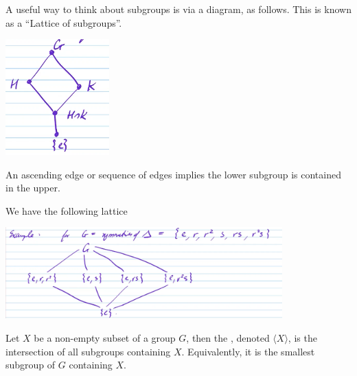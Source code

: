 \documentclass[a4]{scrartcl}
\begin{document}
A useful way to think about subgroups is via a diagram, as follows.
This is known as a ``Lattice of subgroups''.
\begin{center}
	\includegraphics[width=0.3\textwidth]{lattice-ex-1.png}
\end{center}
An ascending edge or sequence of edges implies the lower subgroup is contained in the upper.

\begin{example}
	We have the following lattice
	\begin{center}
		\includegraphics[width=0.8\textwidth]{lattice-ex-2.png}
	\end{center}
\end{example}

\begin{definition}
	Let $X$ be a non-empty subset of a group $G$, then the , denoted $\langle X \rangle$, is the intersection of all subgroups containing $X$. Equivalently, it is the smallest subgroup of $G$ containing $X$.
\end{definition}
\end{document}
